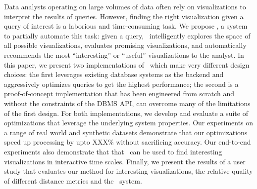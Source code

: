 

Data analysts operating on large volumes of data often rely on visualizations to
interpret the results of queries.
However, finding the right visualization given a query of interest is a
laborious and time-consuming task.
We propose \VizRecDB, a system to partially automate this task:
given a query, \VizRecDB\ intelligently explores the space of all possible
visualizations, evaluates promising visualizations, and automatically recommends
the most ``interesting'' or ``useful'' visualizations to the analyst.
In this paper, we present two implementations of \VizRecDB\ which make very
different design choices: the first leverages existing database systems as the
backend and aggressively optimizes queries to get the highest performance; the
second is a proof-of-concept implementation that has been engineered from scratch and
without the constraints of the DBMS API, can overcome many of the limitations of
the first design.
For both implementations, we develop and evaluate a suite of optimizations that
leverage the underlying system properties.
Our experiments  on a range of real world and synthetic datasets demonstrate
that our optimizations speed up processing by upto XXX\% without sacrificing
accuracy.
Our end-to-end experiments also demonstrate that that \VizRecDB\ can be used to
find interesting visualizations in interactive time scales.
Finally, we present the results of a user study that evaluates our method for
interesting visualizations, the relative quality of different distance metrics
and the \VizRecDB\ system.
